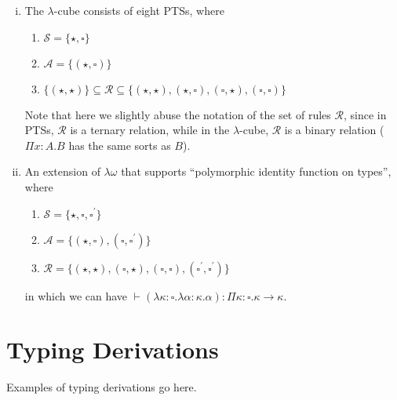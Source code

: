 \documentclass[oneside,a4paper]{article}
\numberwithin{equation}{section}
\begin{document}
\begin{enumerate}[(i)]

\item The $\lambda$-cube consists of eight PTSs, where

\begin{enumerate}
\item $\mathcal{S} = \{\star,\square\}$
\item $\mathcal{A} = \{(\star, \square)\}$
\item $\{(\star, \star)\} \subseteq \mathcal{R} \subseteq \{(\star, \star), (\star, \square), (\square, \star), (\square, \square)\}$
\end{enumerate}

Note that here we slightly abuse the notation of the set of rules $\mathcal{R}$, since in PTSs, $\mathcal{R}$ is a ternary relation, while in the $\lambda$-cube, $\mathcal{R}$ is a binary relation ($\Pi x: A.B$ has the same sorts as $B$).

\item An extension of $\lambda\omega$ that supports ``polymorphic identity function on types'', where

\begin{enumerate}
\item $\mathcal{S} = \{\star,\square, \square^{\prime}\}$
\item $\mathcal{A} = \{(\star, \square), (\square, \square^{\prime})\}$
\item $\mathcal{R} = \{(\star, \star), (\square, \star), (\square, \square), (\square^{\prime}, \square^{\prime})\}$
\end{enumerate}

in which we can have $\vdash (\lambda \kappa : \square.\lambda \alpha : \kappa. \alpha) : \Pi \kappa : \square . \kappa \rightarrow \kappa$.


\end{enumerate}

\section{Typing Derivations}

Examples of typing derivations go here.


\nocite{*}


\end{document}
